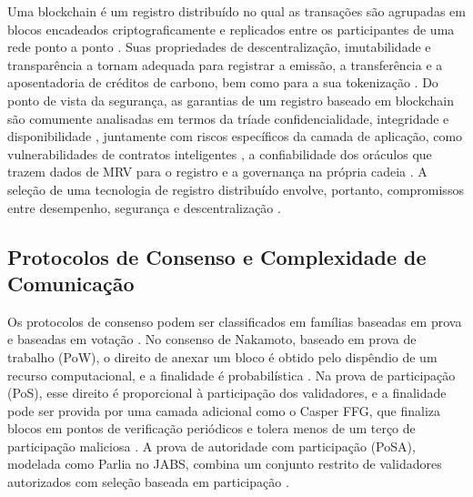 Uma blockchain é um registro distribuído no qual as transações são agrupadas em blocos encadeados criptograficamente e replicados entre os participantes de uma rede ponto a ponto \citep{Nakamoto2008}. Suas propriedades de descentralização, imutabilidade e transparência a tornam adequada para registrar a emissão, a transferência e a aposentadoria de créditos de carbono, bem como para a sua tokenização \citep{Vilkov2023,Kotsialou2021}. Do ponto de vista da segurança, as garantias de um registro baseado em blockchain são comumente analisadas em termos da tríade confidencialidade, integridade e disponibilidade \citep{Aminzade2018,Tchernykh2019,Rashidibajgan2024}, juntamente com riscos específicos da camada de aplicação, como vulnerabilidades de contratos inteligentes \citep{GhiyamiPour2025}, a confiabilidade dos oráculos que trazem dados de MRV para o registro \citep{Rahman2023} e a governança na própria cadeia \citep{Esposito2025}. A seleção de uma tecnologia de registro distribuído envolve, portanto, compromissos entre desempenho, segurança e descentralização \citep{Werth2023,Rodrigues2024}.

\subsection{Protocolos de Consenso e Complexidade de Comunicação}

Os protocolos de consenso podem ser classificados em famílias baseadas em prova e baseadas em votação \citep{Xiao2020,Bamakan2020}. No consenso de Nakamoto, baseado em prova de trabalho (PoW), o direito de anexar um bloco é obtido pelo dispêndio de um recurso computacional, e a finalidade é probabilística \citep{Nakamoto2008}. Na prova de participação (PoS), esse direito é proporcional à participação dos validadores, e a finalidade pode ser provida por uma camada adicional como o Casper FFG, que finaliza blocos em pontos de verificação periódicos e tolera menos de um terço de participação maliciosa \citep{Buterin2017}. A prova de autoridade com participação (PoSA), modelada como Parlia no JABS, combina um conjunto restrito de validadores autorizados com seleção baseada em participação \citep{Caburlao2026clei}.

